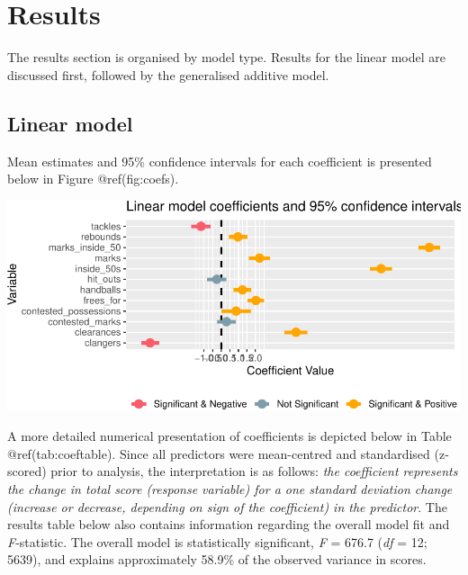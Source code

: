 \documentclass{article}
\begin{document}
\hypertarget{results}{%
\section{Results}\label{results}}

The results section is organised by model type. Results for the linear
model are discussed first, followed by the generalised additive model.

\hypertarget{linear-model}{%
\subsection{Linear model}\label{linear-model}}

Mean estimates and 95\% confidence intervals for each coefficient is
presented below in Figure @ref(fig:coefs).

\includegraphics{OLET5608_TrentHenderson_files/figure-latex/coefs-1.pdf}

A more detailed numerical presentation of coefficients is depicted below
in Table @ref(tab:coeftable). Since all predictors were mean-centred and
standardised (z-scored) prior to analysis, the interpretation is as
follows: \emph{the coefficient represents the change in total score
(response variable) for a one standard deviation change (increase or
decrease, depending on sign of the coefficient) in the predictor}. The
results table below also contains information regarding the overall
model fit and \emph{F}-statistic. The overall model is statistically
significant, \emph{F} = 676.7 (\emph{df} = 12; 5639), and explains
approximately 58.9\% of the observed variance in scores.
\end{document}
